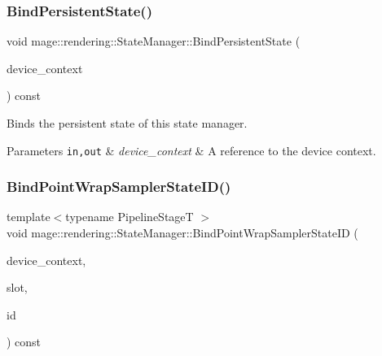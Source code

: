 \subsubsection{\texorpdfstring{Bind\+Persistent\+State()}{BindPersistentState()}}
{\footnotesize\ttfamily void mage\+::rendering\+::\+State\+Manager\+::\+Bind\+Persistent\+State (\begin{DoxyParamCaption}\item[{I\+D3\+D11\+Device\+Context \&}]{device\+\_\+context }\end{DoxyParamCaption}) const\hspace{0.3cm}{\ttfamily [noexcept]}}

Binds the persistent state of this state manager.


\begin{DoxyParams}[1]{Parameters}
\mbox{\tt in,out}  & {\em device\+\_\+context} & A reference to the device context. \\
\hline
\end{DoxyParams}
\mbox{\label{classmage_1_1rendering_1_1_state_manager_a6771451495ed6d83c76e6f008b2d7c17}} 
\subsubsection{\texorpdfstring{Bind\+Point\+Wrap\+Sampler\+State\+I\+D()}{BindPointWrapSamplerStateID()}}
{\footnotesize\ttfamily template$<$typename Pipeline\+StageT $>$ \\
void mage\+::rendering\+::\+State\+Manager\+::\+Bind\+Point\+Wrap\+Sampler\+State\+ID (\begin{DoxyParamCaption}\item[{I\+D3\+D11\+Device\+Context \&}]{device\+\_\+context,  }\item[{\mbox{\hyperlink{namespacemage_aa5d6eaabaac3cdd01873d6a3d27e90f3}{U32}}}]{slot,  }\item[{\mbox{\hyperlink{namespacemage_1_1rendering_a6f80181126db61dbb8b528a6894eb658}{Sampler\+State\+ID}}}]{id }\end{DoxyParamCaption}) const\hspace{0.3cm}{\ttfamily [noexcept]}}

